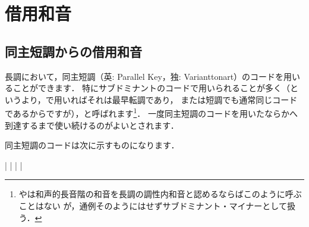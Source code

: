 \documentclass[dvipdfmx,uplatex,b5paper,openany,jbase=12Q,nomag*,textwidth-limit=44%
               ]{gachimuchi}
\begin{document}
\section{借用和音}
\subsection{同主短調からの借用和音}
長調において，同主短調（英: Parallel Key，独: Varianttonart）のコードを用いることができます．
特にサブドミナントのコードで用いられることが多く（というより，\Gni で用いればそれは最早転調であり，
また\Gnv は短調でも通常同じコードであるからですが），と呼ばれます\footnote{%
  \Gniv\Min や\Gnii\Dimt は和声的長音階の和音を長調の調性内和音と認めるならばこのように呼ぶことはない%
  が，通例そのようにはせずサブドミナント・マイナーとして扱う．
}．
一度同主短調のコードを用いたなら\Gni か\Gnv へ到達するまで使い続けるのがよいとされます．


同主短調のコードは次に示すものになります．
\begin{Music}
  \nostartrule%
  \Startpiece%
  \Notes
  \en\bar
  \Notes{}%
  \sk%
  \sk%
  \sk%
  \sk%
  \en\bar
  \Notes{}%
  \sk%
  \sk%
  \en\setdoublebar
  \endpiece%
  \Startpiece%
  \Notes
  \en\bar
  \Notes{}%
  \sk%
  \sk%
  \en\bar
  \Notes{}%
  \sk%
  \en\setdoublebar
  \endpiece%
\end{Music}
\end{document}

